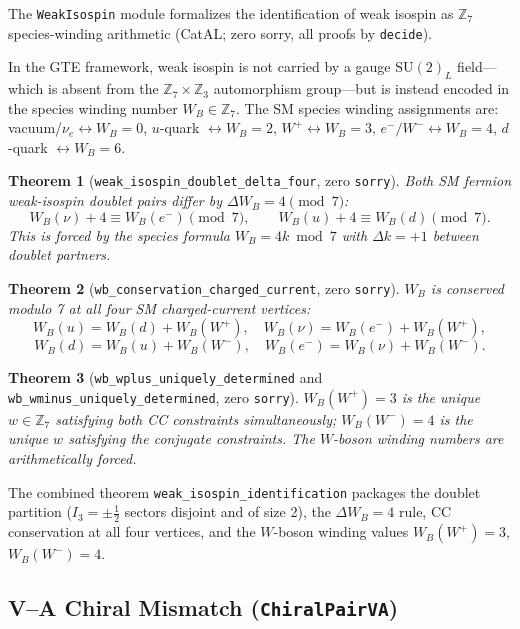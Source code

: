 \documentclass[11pt,a4paper]{article}
\newtheorem{theorem}{Theorem}[section]
\theoremstyle{definition}
\begin{document}
The \texttt{WeakIsospin} module formalizes the identification of weak isospin
as $\mathbb{Z}_7$ species-winding arithmetic (CatAL; zero sorry,
all proofs by \lstinline|decide|).

In the GTE framework, weak isospin is not carried by a gauge $\mathrm{SU}(2)_L$
field---which is absent from the $\mathbb{Z}_7 \times \mathbb{Z}_3$ automorphism
group---but is instead encoded in the species winding number $W_B \in \mathbb{Z}_7$.
The SM species winding assignments are: vacuum/$\nu_e \leftrightarrow W_B=0$,
$u$-quark $\leftrightarrow W_B=2$, $W^+\leftrightarrow W_B=3$, $e^-/W^-\leftrightarrow W_B=4$,
$d$-quark $\leftrightarrow W_B=6$.

\begin{theorem}[\lstinline|weak_isospin_doublet_delta_four|, zero \texttt{sorry}]
Both SM fermion weak-isospin doublet pairs differ by $\Delta W_B = 4 \pmod{7}$:
\[
  W_B(\nu) + 4 \equiv W_B(e^-) \pmod{7}, \qquad
  W_B(u) + 4 \equiv W_B(d) \pmod{7}.
\]
This is forced by the species formula $W_B = 4k \bmod 7$ with $\Delta k = +1$
between doublet partners.
\end{theorem}

\begin{theorem}[\lstinline|wb_conservation_charged_current|, zero \texttt{sorry}]
$W_B$ is conserved modulo 7 at all four SM charged-current vertices:
\[
  W_B(u) = W_B(d) + W_B(W^+),\quad
  W_B(\nu) = W_B(e^-) + W_B(W^+),
\]
\[
  W_B(d) = W_B(u) + W_B(W^-),\quad
  W_B(e^-) = W_B(\nu) + W_B(W^-).
\]
\end{theorem}

\begin{theorem}[\lstinline|wb_wplus_uniquely_determined| and \lstinline|wb_wminus_uniquely_determined|, zero \texttt{sorry}]
$W_B(W^+) = 3$ is the unique $w \in \mathbb{Z}_7$ satisfying both CC constraints
simultaneously; $W_B(W^-) = 4$ is the unique $w$ satisfying the conjugate
constraints. The $W$-boson winding numbers are arithmetically forced.
\end{theorem}

The combined theorem \lstinline|weak_isospin_identification| packages the
doublet partition ($I_3 = \pm\tfrac{1}{2}$ sectors disjoint and of size 2),
the $\Delta W_B = 4$ rule, CC conservation at all four vertices, and the
$W$-boson winding values $W_B(W^+)=3$, $W_B(W^-)=4$.

\subsection{V--A Chiral Mismatch (\texttt{ChiralPairVA})}\label{subsec:chiral-pair-va}
\end{document}
